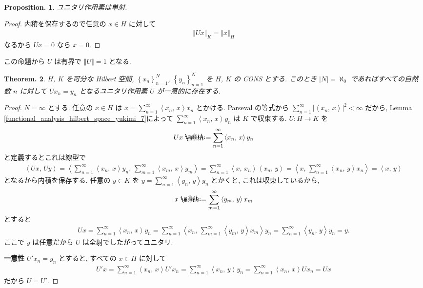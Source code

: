 \documentclass[openany, a4paper, oneside]{jsbook}
\makeatletter
\newcommand*{\defeq}{\mathrel{\rlap{%
\raisebox{0.3ex}{$\m@th\cdot$}}%
\raisebox{-0.3ex}{$\m@th\cdot$}}%
=}
\theoremstyle{break}
\newtheorem{thm}{Theorem.}[section]
\newtheorem{prop}[thm]{Proposition.}
\theoremstyle{breakdefn}
\newcommand{\abs}[1]{\left|#1\right|}
\newcommand{\norm}[1]{\left\Vert#1\right\Vert}
\newcommand{\cbk}[1]{\left\{#1\right\}}
\newcommand{\bkt}[2]{\left\langle#1,\,#2\right\rangle}
\makeatother
\begin{document}
\begin{prop}
 ユニタリ作用素は単射.
\end{prop}
\begin{proof}
内積を保存するので任意の $x \in H$ に対して
\begin{align}
 \norm{Ux}_K
 =
 \norm{x}_H
\end{align}
なるから $Ux = 0$ なら $x = 0$.
\end{proof}
この命題から $U$ は有界で $\norm{U} = 1$ となる.

\begin{thm}\label{functional_analysis_hilbert_space_yukimi_12}
 $H$, $K$ を可分な Hilbert 空間, $\cbk{x_n}_{n=1}^N$, $\cbk{y_n}_{n=1}^N$ を $H$, $K$ の CONS とする.
 このとき $\abs{N} = \aleph_0$ であればすべての自然数 $n$ に対して $Ux_n = y_n$ となるユニタリ作用素 $U$ が一意的に存在する.
\end{thm}
\begin{proof}
$N = \infty$ とする.
任意の $x \in H$ は $x = \sum_{n=1}^\infty \bkt{x_n}{x} x_n$ とかける.
Parseval の等式から $\sum_{n=1}^\infty \abs{\bkt{x_n}{x}}^2 < \infty$ だから,
Lemma \ref{functional_analysis_hilbert_space_yukimi_7}によって $\sum_{n=1}^\infty \bkt{x_n}{x} y_n$ は $K$ で収束する.
$U \colon H \to K$ を
\begin{align}
 Ux
 \defeq
 \sum_{n=1}^\infty \bkt{x_n}{x} y_n
\end{align}
と定義するとこれは線型で
\begin{align}
 \bkt{Ux}{Uy}
 =
 \bkt{\sum_{n=1}^{\infty} \bkt{x_n}{x} y_n}{\sum_{m=1}^{\infty} \bkt{x_m}{x} y_m}
 =
 \sum_{n=1}^{\infty} \bkt{x}{x_n} \bkt{x_n}{y}
 =
 \bkt{x}{\sum_{n=1}^{\infty} \bkt{x_n}{y} x_n}
 =
 \bkt{x}{y}
\end{align}
となるから内積を保存する.
任意の $y \in K$ を $y = \sum_{n=1}^{\infty} \bkt{y_n}{y} y_n$ とかくと, これは収束しているから,
\begin{align}
 x
 \defeq
 \sum_{m=1}^{\infty} \bkt{y_m}{y} x_m
\end{align}
とすると
\begin{align}
 U x
 =
 \sum_{n=1}^{\infty} \bkt{x_n}{x} y_n
 =
 \sum_{n=1}^{\infty} \bkt{x_n}{\sum_{m=1}^{\infty} \bkt{y_m}{y} x_m} y_n
 =
 \sum_{n=1}^{\infty} \bkt{y_n}{y} y_n
 =
 y.
\end{align}
ここで $y$ は任意だから $U$ は全射でしたがってユニタリ.

\textbf{一意性}
$U'x_n = y_n$ とすると, すべての $x \in H$ に対して
\begin{align}
 U'x
 =
 \sum_{n=1}^{\infty} \bkt{x_n}{x} U' x_n
 =
 \sum_{n=1}^{\infty} \bkt{x_n}{y} y_n
 =
 \sum_{n=1}^{\infty} \bkt{x_n}{x} Ux_n
 =
 Ux
\end{align}
だから $U = U'$.
\end{proof}
\end{document}

